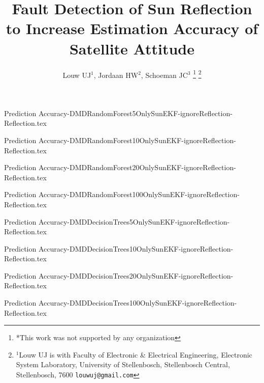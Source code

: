 \documentclass[letterpaper, 10 pt, conference]{ieeeconf}  %
\title{\LARGE \bf
	Fault Detection of Sun Reflection to Increase Estimation Accuracy of Satellite Attitude
}
\author{Louw UJ$^{1}$, Jordaan HW$^{2}$, Schoeman JC$^{3}$%
	\thanks{*This work was not supported by any organization}%
	\thanks{$^{1}$Louw UJ is with Faculty of Electronic \& Electrical Engineering, Electronic System            Laboratory, University of Stellenbosch, Stellenbosch Central, Stellenbosch, 7600
		{\tt\small louwuj@gmail.com}}%
}
\begin{document}
	
	{Prediction Accuracy-DMDRandomForest5OnlySunEKF-ignoreReflection-Reflection.tex}
	
	{Prediction Accuracy-DMDRandomForest10OnlySunEKF-ignoreReflection-Reflection.tex}
	
	{Prediction Accuracy-DMDRandomForest20OnlySunEKF-ignoreReflection-Reflection.tex}
	
	{Prediction Accuracy-DMDRandomForest100OnlySunEKF-ignoreReflection-Reflection.tex}
	
	\newpage
	
	
	
	{Prediction Accuracy-DMDDecisionTrees5OnlySunEKF-ignoreReflection-Reflection.tex}
	
	{Prediction Accuracy-DMDDecisionTrees10OnlySunEKF-ignoreReflection-Reflection.tex}
	
	{Prediction Accuracy-DMDDecisionTrees20OnlySunEKF-ignoreReflection-Reflection.tex}
	
	{Prediction Accuracy-DMDDecisionTrees100OnlySunEKF-ignoreReflection-Reflection.tex}
	

	
	
\end{document}
